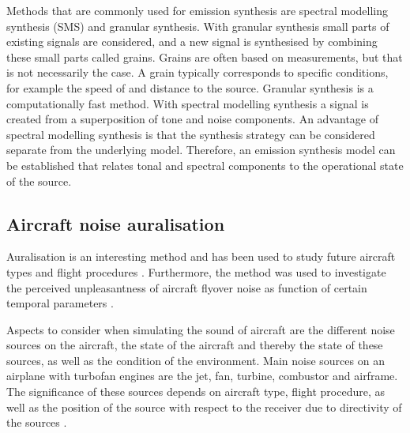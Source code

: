 Methods that are commonly used for emission synthesis are spectral modelling
synthesis (SMS) and granular synthesis. With granular synthesis small parts of
existing signals are considered, and a new signal is synthesised by combining
these small parts called grains. Grains are often based on measurements, but
that is not necessarily the case. A grain typically corresponds to specific
conditions, for example the speed of and distance to the source. Granular
synthesis is a computationally fast method. With spectral modelling synthesis a
signal is created from a superposition of tone and noise components. An
advantage of spectral modelling synthesis is that the synthesis strategy can be
considered separate from the underlying model. Therefore, an emission synthesis
model can be established that relates tonal and spectral components to the
operational state of the source.

\subsection*{Aircraft noise auralisation}
Auralisation is an interesting method and has been used to study future aircraft
types \cite{Rizzi2013,Rizzi2016,Rizzi2016a} and flight procedures
\cite{Sahai2016}. Furthermore, the method was used to investigate the perceived
unpleasantness of aircraft flyover noise as function of certain temporal
parameters \cite{Pate2017}.

Aspects to consider when simulating the sound of aircraft are the different
noise sources on the aircraft, the state of the aircraft and thereby the state
of these sources, as well as the condition of the environment. Main noise
sources on an airplane with turbofan engines are the jet, fan, turbine,
combustor and airframe. The significance of these sources depends on aircraft
type, flight procedure, as well as the position of the source with respect to
the receiver due to directivity of the sources \cite{Bertsch2015}.


